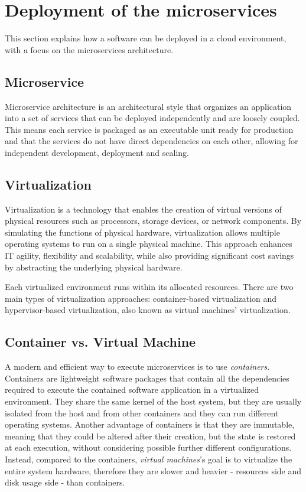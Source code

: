 \section{Deployment of the microservices}

This section explains how a software can be deployed in a cloud environment, with a focus on the microservices architecture.

\subsection{Microservice}

Microservice architecture is an architectural style that organizes an application into a set of services that can be deployed independently and are loosely coupled. This means each service is packaged as an executable unit ready for production and that the services do not have direct dependencies on each other, allowing for independent development, deployment and scaling.~\cite{microservices-what-are}

\subsection{Virtualization}

Virtualization is a technology that enables the creation of virtual versions of physical resources such as processors, storage devices, or network components. By simulating the functions of physical hardware, virtualization allows multiple operating systems to run on a single physical machine. This approach enhances IT agility, flexibility and scalability, while also providing significant cost savings by abstracting the underlying physical hardware.~\cite{virtualization-aws}

Each virtualized environment runs within its allocated resources. There are two main types of virtualization approaches: container-based virtualization and hypervisor-based virtualization, also known as virtual machines' virtualization.

\subsection{Container vs. Virtual Machine}

A modern and efficient way to execute microservices is to use \textit{containers}. \\
Containers are lightweight software packages that contain all the dependencies required to execute the contained software application in a virtualized environment. They share the same kernel of the host system, but they are usually isolated from the host and from other containers and they can run different operating systems. Another advantage of containers is that they are immutable, meaning that they could be altered after their creation, but the state is restored at each execution, without considering possible further different configurations.\\
Instead, compared to the containers, \textit{virtual machines}'s goal is to virtualize the entire system hardware, therefore they are slower and heavier - resources side and disk usage side - than containers.

